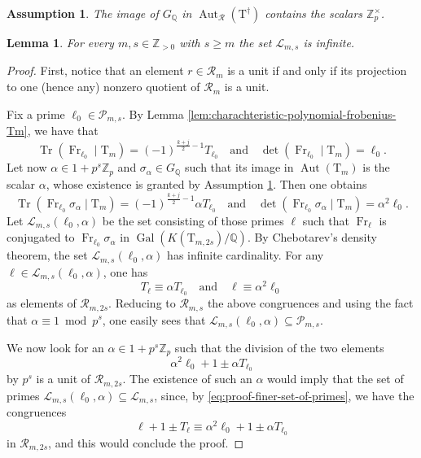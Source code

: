 \documentclass[10pt,a4paper]{amsart}
\newtheorem{lemma}{Lemma}
\newtheorem{assumption}{Assumption}
\DeclareMathOperator{\Aut}{Aut}
\DeclareMathOperator{\Fr}{Fr}
\DeclareMathOperator{\Gal}{Gal}
\newcommand{\Q}{\numberset{Q}}
\newcommand{\T}{\boldsymbol{\mathrm{T}}}
\DeclareMathOperator{\Tr}{Tr}
\newcommand{\Z}{\numberset{Z}}
\newcommand{\calR}{\mathcal{R}}
\newcommand{\ga}{\alpha}
\newcommand{\gs}{\sigma}
\newcommand{\numberset}{\mathbb}
\begin{document}
\begin{assumption}\label{ass:big-image}
    The image of $G_\Q$ in $\Aut_{\mathcal{R}}(\T^{\dag})$ contains the scalars $\Z_p^\times$.
\end{assumption}

\begin{lemma}\label{lem:finer-choice-of-primes}
    For every $m,s\in\Z_{>0}$ with $s\ge m$ the set $\mathcal{L}_{m,s}$ is infinite.
\end{lemma}

\begin{proof}
    First, notice that an element $r\in\mathcal{R}_m$ is a unit if and only if its projection to one (hence any) nonzero quotient of $\calR_m$ is a unit.

    Fix a prime $\ell_0\in\mathcal{P}_{m,s}$. By Lemma \ref{lem:charachteristic-polynomial-frobenius-Tm}, we have that
    \begin{equation*}
        \Tr(\Fr_{\ell_0}\mid \T_m)=(-1)^{\frac{k+j}{2}-1}T_{\ell_0}\quad\text{and}\quad\det(\Fr_{\ell_0}\mid \T_m)=\ell_0.
    \end{equation*}
    Let now $\ga\in 1+p^s\Z_p$ and $\gs_\ga\in G_\Q$ such that its image in $\Aut(\T_m)$ is the scalar $\ga$, whose existence is granted by Assumption \ref{ass:big-image}. Then one obtains
    \begin{equation*}
        \Tr(\Fr_{\ell_0}\gs_\ga\mid \T_m)=(-1)^{\frac{k+j}{2}-1}\ga T_{\ell_0}\quad\text{and}\quad\det(\Fr_{\ell_0}\gs_\ga\mid \T_m)=\ga^2\ell_0.
    \end{equation*}
    Let $\mathcal{L}_{m,s}(\ell_0, \alpha)$ be the set consisting of those primes $\ell$ such that $\Fr_\ell$ is conjugated to $\Fr_{\ell_0}\gs_\ga$ in $\Gal(K(\T_{m,2s})/\Q)$. By Chebotarev's density theorem, the set $\mathcal{L}_{m,s}(\ell_0, \alpha)$ has infinite cardinality. For any $\ell\in\mathcal{L}_{m,s}(\ell_0, \alpha)$, one has
    \begin{equation}\label{eq:proof-finer-set-of-primes}
        T_{\ell}\equiv \ga T_{\ell_0}\quad\text{and}\quad \ell\equiv\ga^2\ell_0
    \end{equation}
    as elements of $\calR_{m,2s}$. Reducing to $\calR_{m,s}$ the above congruences and using the fact that $\ga\equiv 1\bmod p^s$, one easily sees that $\mathcal{L}_{m,s}(\ell_0, \alpha)\subseteq\mathcal{P}_{m,s}$. 

    We now look for an $\ga\in 1+p^s\Z_p$ such that the division of the two elements
    \begin{equation}\label{eq:elements-to-be-divided}
        \ga^2\ell_0+1\pm\ga T_{\ell_0}
    \end{equation}
    by $p^s$ is a unit of $\mathcal{R}_{m,2s}$. The existence of such an $\ga$ would imply that the set of primes $\mathcal{L}_{m,s}(\ell_0,\ga)\subseteq\mathcal{L}_{m,s}$, since, by \eqref{eq:proof-finer-set-of-primes}, we have the congruences
    \begin{equation*}
        \ell+1\pm T_\ell\equiv \ga^2\ell_0+1\pm\ga T_{\ell_0}
    \end{equation*}
    in $\calR_{m,2s}$, and this would conclude the proof.


\end{proof}
\end{document}
